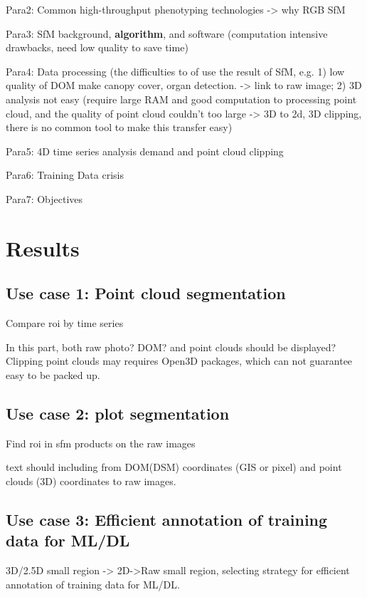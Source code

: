 \documentclass{configs/bmcart}
\begin{document}
Para2: Common high-throughput phenotyping technologies -> why RGB SfM

Para3: SfM background, \textbf{algorithm}, and software (computation intensive drawbacks, need low quality to save time)

Para4: Data processing (the difficulties to of use the result of SfM, e.g. 1) low quality of DOM make canopy cover, organ detection. -> link to raw image; 2) 3D analysis not easy (require large RAM and good computation to processing point cloud, and the quality of point cloud couldn't too large -> 3D to 2d, 3D clipping, there is no common tool to make this transfer easy)


Para5: 4D time series analysis demand and point cloud clipping

Para6: Training Data crisis

Para7: Objectives

\section*{Results}

\subsection*{Use case 1: Point cloud segmentation}
Compare \acrshort*{roi} by time series

In this part, both raw photo? DOM? and point clouds should be displayed? Clipping point clouds may requires Open3D packages, which can not guarantee easy to be packed up.

\subsection*{Use case 2: plot segmentation}

Find \acrshort*{roi} in \acrshort*{sfm} products on the raw images

text \cite{ma_calculation_2019, guo_illumination_2013}
should including from DOM(DSM) coordinates (GIS or pixel) and point clouds (3D) coordinates to raw images.

\subsection*{Use case 3: Efficient annotation of training data for ML/DL}
3D/2.5D small region -> 2D->Raw small region, selecting strategy for efficient annotation of training data for ML/DL.
\end{document}
